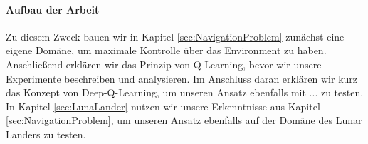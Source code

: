 \paragraph{Aufbau der Arbeit}
Zu diesem Zweck bauen wir in Kapitel \ref{sec:NavigationProblem} zunächst eine eigene Domäne, um maximale Kontrolle über das Environment zu haben. Anschließend erklären wir das Prinzip von Q-Learning, bevor wir unsere Experimente beschreiben und analysieren. Im Anschluss daran erklären wir kurz das Konzept von Deep-Q-Learning, um unseren Ansatz ebenfalls mit ... zu testen. In Kapitel \ref{sec:LunaLander} nutzen wir unsere Erkenntnisse aus Kapitel \ref{sec:NavigationProblem}, um unseren Ansatz ebenfalls auf der Domäne des Lunar Landers zu testen. 
